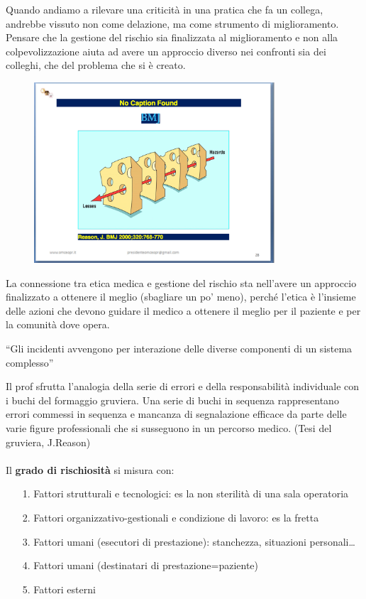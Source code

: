 Quando andiamo a rilevare una criticità in una pratica che fa un
collega, andrebbe vissuto non come delazione, ma come strumento di
miglioramento. Pensare che la gestione del rischio sia finalizzata al
miglioramento e non alla colpevolizzazione aiuta ad avere un approccio
diverso nei confronti sia dei colleghi, che del problema che si è
creato.

\begin{figure}[!ht]
\centering
	\includegraphics[width=0.8\textwidth]{30/image2.png}
	\end{figure}

La
connessione tra etica medica e gestione del rischio sta nell'avere un
approccio finalizzato a ottenere il meglio (sbagliare un po' meno),
perché l'etica è l'insieme delle azioni che devono guidare il medico a
ottenere il meglio per il paziente e per la comunità dove opera.

``Gli incidenti avvengono per interazione delle diverse componenti di un
sistema complesso''

Il prof sfrutta l'analogia della serie di errori e della responsabilità
individuale con i buchi del formaggio gruviera. Una serie di buchi in
sequenza rappresentano errori commessi in sequenza e mancanza di
segnalazione efficace da parte delle varie figure professionali che si
susseguono in un percorso medico. (Tesi del gruviera, J.Reason)
\\\\
Il \textbf{grado di rischiosità} si misura con:

\begin{itemize}
\item[1.]
  Fattori strutturali e tecnologici: es la non sterilità di una sala
  operatoria
\item[2.]
  Fattori organizzativo-gestionali e condizione di lavoro: es la fretta
\item[3.]
  Fattori umani (esecutori di prestazione): stanchezza, situazioni
  personali\ldots{}
\item[4.]
  Fattori umani (destinatari di prestazione=paziente)
\item[5.]
  Fattori esterni
\end{itemize}

